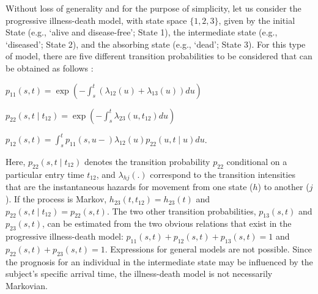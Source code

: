 Without loss of generality and for the purpose of simplicity, let us consider the progressive illness-death model, with state space $\{1,2,3\}$, given by the initial State (e.g., `alive and disease-free'; State 1), the intermediate state (e.g., `diseased'; State 2), and the absorbing state (e.g., `dead'; State 3). For this type of model, there are five different transition probabilities to be considered that can be obtained as follows \citep{LFMM2019}:
\begin{center}
$p_{11}(s,t) = \exp\left(-\int_s^t \left(\lambda_{12}(u)+\lambda_{13}(u)\right)du\right)$
\end{center}
\begin{center}
$p_{22}(s,t\mid t_{12})= \exp\left(-\int_s^t \lambda_{23}(u,
t_{12})du\right)$
\end{center}
\begin{center}
$p_{12}(s,t) =\int_s^t p_{11}(s,u-)\lambda_{12}(u)p_{22}(u,t\mid
u)du$.
\end{center}
\noindent Here, $p_{22}(s, t\mid t_{12})$ denotes the transition probability $p_{22}$ conditional on a particular entry time $t_{12}$, and $\lambda_{hj}(.)$ correspond to the transition intensities that are the instantaneous hazards for movement from one state ($h$) to another ($j$). If the process is Markov, $h_{23}(t, t_{12})=h_{23}(t)$ and $p_{22}(s, t\mid t_{12})=p_{22}(s, t)$. The two other transition probabilities, $p_{13}(s,t)$ and $p_{23}(s,t)$, can be estimated from the two obvious relations that exist in the progressive illness-death model: $p_{11}(s,t)+p_{12}(s,t)+p_{13}(s,t)=1$ and $p_{22}(s,t)+p_{23}(s,t)=1$. Expressions for general models are not possible. Since the prognosis for an individual in the intermediate state may be influenced by the subject's specific arrival time, the illness-death model is not necessarily Markovian.

